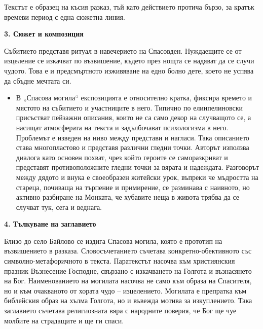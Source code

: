 \documentclass[12pt,a4paper]{article}
\begin{document}
\indent Текстът е образец на късия разказ, тъй като действието протича бързо, за кратък времеви период с една сюжетна линия.

\vspace{0.1cm}
 
\noindent 
\textbf{3. Сюжет и композиция}
\vspace{0.1cm}
 
\indent Събитието представя ритуал в навечерието на Спасовден. Нуждаещите се от изцеление се изкачват по възвишение, където през нощта се надяват да се случи чудото. Това е и предсмъртното изживяване на едно болно дете, което не успява да сбъдне мечтата си.

\begin{itemize}[leftmargin=*]
\vspace{-0.2cm}
\item В „Спасова могила“ експозицията е относително кратка, фиксира времето и мястото на събитието и участниците в него. Типично по елинпелиновски присъстват пейзажни описания, които не са само декор на случващото се, а насищат атмосферата на текста и задълбочават психологизма в него. Проблемът е изведен на ниво между представи и нагласи. Така описанието става многопластово и представя различни гледни точки. Авторът използва диалога като основен похват, чрез който героите се саморазкриват и представят противоположните гледни точки за вярата и надеждата. Разговорът между дядото и внука е своеобразен житейски урок, въпреки че мъдростта на стареца, почиваща на търпение и примирение, се разминава с наивното, но активно разбиране на Монката, че хубавите неща в живота трябва да се случват тук, сега и веднага.
\end{itemize}

\vspace{0.1cm}
 
\noindent 
\textbf{4. Тълкуване на заглавието}
\vspace{0.1cm}
 
\indent Близо до село Байлово се издига Спасова могила, която е прототип на възвишението в разказа. Словосъчетанието съчетава конкретно-обективното със символно-метафоричното в текста. Паратекстът насочва към християнския празник Възнесение Господне, свързано с изкачването на Голгота и възнасянето на Бог. Наименованието на могилата насочва не само към образа на Спасителя, но и към очакваното от хората чудо – изцелението. Могилата е препратка към библейския образ на хълма Голгота, но и въвежда мотива за изкуплението. Така заглавието съчетава религиозната вяра с народните поверия, че Бог ще чуе молбите на страдащите и ще ги спаси. 
\end{document}
